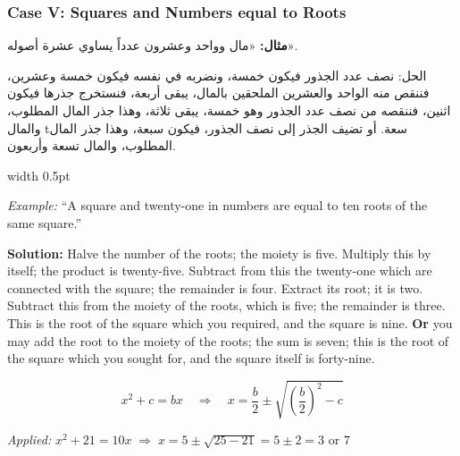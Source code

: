\documentclass[10pt,a4paper]{book}
\newlength{\colwidth}
\newcommand{\bilingualpair}[2]{%
  \noindent
  \begin{minipage}[t]{\colwidth}
  \begin{flushright}
  \vspace{0pt}
  {\arabicfont\small #1}
  \end{flushright}
  \end{minipage}%
  \hfill\textcolor{columnsepclr}{\vrule width 0.5pt}\hfill
  \begin{minipage}[t]{\colwidth}
  \vspace{0pt}
  {\small #2}
  \end{minipage}%
  \par\vspace{0.6em}
}
\begin{document}
\subsubsection*{Case V: Squares and Numbers equal to Roots}

\bilingualpair{
\textbf{مثال:} «مال وواحد وعشرون عدداً يساوي عشرة أصوله».

الحل: نصف عدد الجذور فيكون خمسة، ونضربه في نفسه فيكون
خمسة وعشرين، فننقص منه الواحد والعشرين الملحقين بالمال،
يبقى أربعة، فنستخرج جذرها فيكون اثنين، فننقصه من نصف عدد
الجذور وهو خمسة، يبقى ثلاثة، وهذا جذر المال المطلوب، والمال
tسعة. أو تضيف الجذر إلى نصف الجذور، فيكون سبعة، وهذا جذر
المال المطلوب، والمال تسعة وأربعون.
}{
\textit{Example:} ``A square and twenty-one in numbers are equal to ten roots
of the same square.''

\textbf{Solution:} Halve the number of the roots; the moiety is five.
Multiply this by itself; the product is twenty-five. Subtract from this the
twenty-one which are connected with the square; the remainder is four.
Extract its root; it is two. Subtract this from the moiety of the roots,
which is five; the remainder is three. This is the root of the square which
you required, and the square is nine. \textbf{Or} you may add the root to the
moiety of the roots; the sum is seven; this is the root of the square which
you sought for, and the square itself is forty-nine.
}

\vspace{0.5em}
\begin{mathbox}[title={\textbf{The Algorithm for Case V}}]
\begin{equation}
x^2 + c = bx \quad\Longrightarrow\quad x = \frac{b}{2} \pm \sqrt{\left(\frac{b}{2}\right)^2 - c}
\end{equation}

\textit{Applied:} $x^2 + 21 = 10x \;\Rightarrow\; x = 5 \pm \sqrt{25 - 21} = 5 \pm 2 = 3 \text{ or } 7$
\end{mathbox}
\vspace{0.5em}
\end{document}
